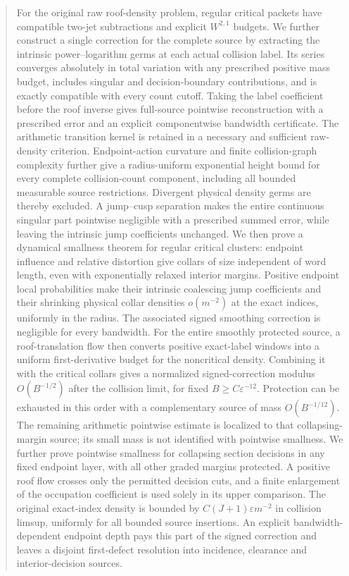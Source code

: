 \documentclass[11pt,reqno]{amsart}
\numberwithin{equation}{section}
\theoremstyle{definition}\newtheorem{definition}[theorem]{Definition}
\theoremstyle{remark}\newtheorem{remark}[theorem]{Remark}
\begin{document}
\begin{abstract}
For the original raw roof-density problem, regular critical packets
have compatible two-jet subtractions and explicit $W^{2,1}$ budgets.
We further construct a single correction for the complete source by
extracting the intrinsic power--logarithm germs at each actual collision
label. Its series converges absolutely in total variation with any
prescribed positive mass budget, includes singular and decision-boundary
contributions, and is exactly compatible with every count cutoff.
Taking the label coefficient before the roof inverse gives full-source
pointwise reconstruction with a prescribed error and an explicit
componentwise bandwidth certificate. The arithmetic transition kernel
is retained in a necessary and sufficient raw-density criterion.
Endpoint-action curvature and finite collision-graph complexity further
give a radius-uniform exponential height bound for every complete
collision-count component, including all bounded measurable source
restrictions. Divergent physical density germs are thereby excluded.
A jump--cusp separation makes the entire continuous singular part
pointwise negligible with a prescribed summed error, while leaving
the intrinsic jump coefficients unchanged. We then prove a dynamical
smallness theorem for regular critical clusters: endpoint influence and
relative distortion give collars of size independent of word length,
even with exponentially relaxed interior margins. Positive endpoint
local probabilities make their intrinsic coalescing jump coefficients
and their shrinking physical collar densities $o(m^{-2})$ at the exact
indices, uniformly in the radius. The associated signed smoothing
correction is negligible for every bandwidth. For the entire smoothly protected source, a roof-translation flow
then converts positive exact-label windows into a uniform first-derivative
budget for the noncritical density. Combining it with the critical
collars gives a normalized signed-correction modulus $O(B^{-1/2})$
after the collision limit, for fixed $B\ge C\varepsilon^{-12}$.
Protection can be exhausted in this order with a complementary source
of mass $O(B^{-1/12})$. The remaining arithmetic pointwise estimate is
localized to that collapsing-margin source; its small mass is not
identified with pointwise smallness. We further prove pointwise
smallness for collapsing section decisions in any fixed endpoint
layer, with all other graded margins protected. A positive roof flow
crosses only the permitted decision cuts, and a finite enlargement of
the occupation coefficient is used solely in its upper comparison.
The original exact-index density is bounded by $C(J+1)\varepsilon
m^{-2}$ in collision limsup, uniformly for all bounded source
insertions. An explicit bandwidth-dependent endpoint depth pays this
part of the signed correction and leaves a disjoint first-defect
resolution into incidence, clearance and interior-decision sources.
\end{abstract}
\maketitle
\enlargethispage{3pt}
\end{document}
